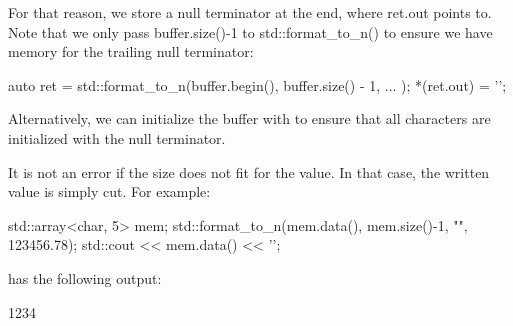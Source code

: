For that reason, we store a null terminator at the end, where ret.out points to. Note that we only pass buffer.size()-1 to std::format\_to\_n() to ensure we have memory for the trailing null terminator:

\begin{cpp}
auto ret = std::format_to_n(buffer.begin(), buffer.size() - 1, ... );
*(ret.out) = '\0';
\end{cpp}

Alternatively, we can initialize the buffer with {} to ensure that all characters are initialized with the null terminator.

It is not an error if the size does not fit for the value. In that case, the written value is simply cut. For example:

\begin{cpp}
std::array<char, 5> mem{};
std::format_to_n(mem.data(), mem.size()-1, "{}", 123456.78);
std::cout << mem.data() << '\n';
\end{cpp}

has the following output:

\begin{shell}
1234
\end{shell}



